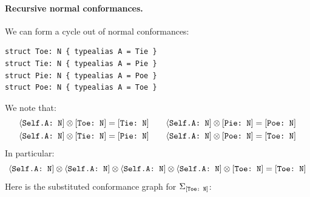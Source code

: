 \documentclass[../generics]{subfiles}
\begin{document}
\paragraph{Recursive normal conformances.} We can form a cycle out of normal conformances:
\begin{Verbatim}
struct Toe: N { typealias A = Tie }
struct Tie: N { typealias A = Pie }
struct Pie: N { typealias A = Poe }
struct Poe: N { typealias A = Toe }
\end{Verbatim}
We note that:
\begin{gather*}
\langle\texttt{Self.A:~N}] \otimes [\texttt{Toe:~N}] = [\texttt{Tie:~N}]\qquad\langle\texttt{Self.A:~N}] \otimes [\texttt{Pie:~N}] = [\texttt{Poe:~N}]\\
\langle\texttt{Self.A:~N}] \otimes [\texttt{Tie:~N}] = [\texttt{Pie:~N}]\qquad\langle\texttt{Self.A:~N}] \otimes [\texttt{Poe:~N}] = [\texttt{Toe:~N}]
\end{gather*}
In particular:
\[
\langle\texttt{Self.A:~N}] \otimes \langle\texttt{Self.A:~N}] \otimes \langle\texttt{Self.A:~N}] \otimes \langle\texttt{Self.A:~N}] \otimes [\texttt{Toe:~N}] = [\texttt{Toe:~N}]
\]
Here is the substituted conformance graph for $\Sigma_{[\texttt{Toe:~N}]}$:
\begin{center}
\end{center}
\end{document}
